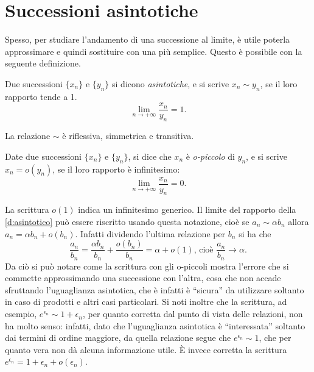 \section{Successioni asintotiche}
Spesso, per studiare l'andamento di una successione al limite, è utile poterla approssimare e quindi sostituire con una più semplice. Questo è possibile con la seguente definizione.
\begin{definizione}
\label{d:asintotico}
Due successioni $\{x_n\}$ e $\{y_n\}$ si dicono \emph{asintotiche}, e si scrive $x_n\sim y_n$, se il loro rapporto tende a 1.
\[
\lim_{n\to +\infty}\frac{x_n}{y_n}=1.
\]
\end{definizione}
La relazione $\sim$ è riflessiva, simmetrica e transitiva.
\begin{definizione}
Date due successioni $\{x_n\}$ e $\{y_n\}$, si dice che $x_n$ è \emph{o-piccolo} di $y_n$, e si scrive $x_n=o(y_n)$, se il loro rapporto è infinitesimo:
\[
\lim_{n\to +\infty}\frac{x_n}{y_n}=0.
\]
\end{definizione}
La scrittura $o(1)$ indica un infinitesimo generico.
Il limite del rapporto della \ref{d:asintotico} può essere riscritto usando questa notazione, cioè se $a_n\sim\alpha b_n$ allora $a_n=\alpha b_n+o(b_n)$. Infatti dividendo l'ultima relazione per $b_n$ si ha che
\[
\frac{a_n}{b_n}=\frac{\alpha b_n}{b_n}+\frac{o(b_n)}{b_n}=\alpha+o(1)\text{, cioè }\frac{a_n}{b_n}\to\alpha.
\]
Da ciò si può notare come la scrittura con gli o-piccoli mostra l'errore che si commette approssimando una successione con l'altra, cosa che non accade sfruttando l'uguaglianza asintotica, che è infatti è ``sicura'' da utilizzare soltanto in caso di prodotti e altri casi particolari.
Si noti inoltre che la scrittura, ad esempio, $e^{\epsilon_n}\sim 1+\epsilon_n$, per quanto corretta dal punto di vista delle relazioni, non ha molto senso: infatti, dato che l'uguaglianza asintotica è ``interessata'' soltanto dai termini di ordine maggiore, da quella relazione segue che $e^{\epsilon_n}\sim 1$, che per quanto vera non dà alcuna informazione utile. È invece corretta la scrittura $e^{\epsilon_n}=1+\epsilon_n+o(\epsilon_n)$.

